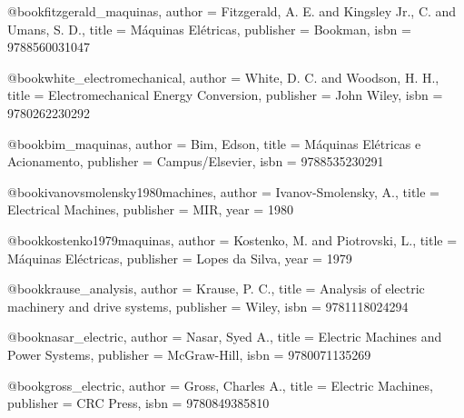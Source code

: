 




%

@book{fitzgerald_maquinas,
  author = {Fitzgerald, A. E. and Kingsley Jr., C. and Umans, S. D.},
  title = {Máquinas Elétricas},
  publisher = {Bookman},
  isbn = {9788560031047}
}

@book{white_electromechanical,
  author = {White, D. C. and Woodson, H. H.},
  title = {Electromechanical Energy Conversion},
  publisher = {John Wiley},
  isbn = {9780262230292}
}

@book{bim_maquinas,
  author = {Bim, Edson},
  title = {Máquinas Elétricas e Acionamento},
  publisher = {Campus/Elsevier},
  isbn = {9788535230291}
}

@book{ivanovsmolensky1980machines,
  author = {Ivanov-Smolensky, A.},
  title = {Electrical Machines},
  publisher = {MIR},
  year = {1980}
}

@book{kostenko1979maquinas,
  author = {Kostenko, M. and Piotrovski, L.},
  title = {Máquinas Eléctricas},
  publisher = {Lopes da Silva},
  year = {1979}
}

@book{krause_analysis,
  author = {Krause, P. C.},
  title = {Analysis of electric machinery and drive systems},
  publisher = {Wiley},
  isbn = {9781118024294}
}

@book{nasar_electric,
  author = {Nasar, Syed A.},
  title = {Electric Machines and Power Systems},
  publisher = {McGraw-Hill},
  isbn = {9780071135269}
}

@book{gross_electric,
  author = {Gross, Charles A.},
  title = {Electric Machines},
  publisher = {CRC Press},
  isbn = {9780849385810}
}

